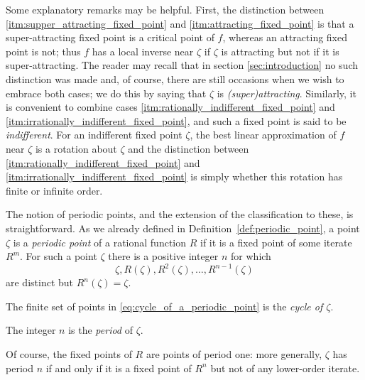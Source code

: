 Some explanatory remarks may be helpful. First, the distinction between
\ref{itm:supper_attracting_fixed_point} and \ref{itm:attracting_fixed_point} is
that a super-attracting fixed point is a critical point of $f$, whereas an
attracting fixed point is not; thus $f$ has a local inverse near $\zeta$ if
$\zeta$ is attracting but not if it is super-attracting. The reader may recall
that in section \ref{sec:introduction} no such distinction was made and, of
course, there are still occasions when we wish to embrace both cases; we do this
by saying that $\zeta$ is \emph{(super)attracting}. Similarly, it is convenient
to combine cases \ref{itm:rationally_indifferent_fixed_point} and
\ref{itm:irrationally_indifferent_fixed_point}, and such a fixed point is said
to be \emph{indifferent}. For an indifferent fixed point $\zeta$, the best
linear approximation of $f$ near $\zeta$ is a rotation about $\zeta$ and the
distinction between \ref{itm:rationally_indifferent_fixed_point} and
\ref{itm:irrationally_indifferent_fixed_point} is simply whether this rotation
has finite or infinite order.

The notion of periodic points, and the extension of the classification to these,
is straightforward. As we already defined in
Definition~\ref{def:periodic_point}, a point $\zeta$ is a \emph{periodic point}
of a rational function $R$ if it is a fixed point of some iterate $R^m$. For
such a point $\zeta$ there is a positive integer $n$ for which
\begin{equation}
    \label{eq:cycle_of_a_periodic_point}
    \zeta, R(\zeta), R^2(\zeta), \dots, R^{n-1}(\zeta)
\end{equation}
are distinct but $R^n(\zeta) = \zeta$.

\begin{definition}
    The finite set of points in \eqref{eq:cycle_of_a_periodic_point} is the
    \emph{cycle of $\zeta$}.
\end{definition}

\begin{definition}
    The integer $n$ is the \emph{period} of $\zeta$.
\end{definition}

Of course, the fixed points of $R$ are points of period one: more generally,
$\zeta$ has period $n$ if and only if it is a fixed point of $R^n$ but not of
any lower-order iterate.

